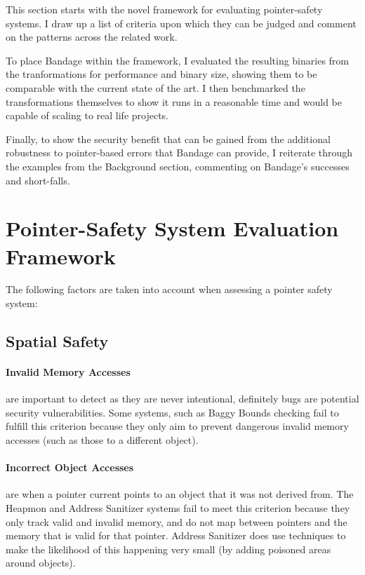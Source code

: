 \newcommand*\rot{\rotatebox{90}}
\newcommand{\xmark}{\ding{55}}

This section starts with the novel framework for evaluating pointer-safety systems.
I draw up a list of criteria upon which they can be judged and comment on the patterns across the related work.

To place Bandage within the framework, I evaluated the resulting binaries from the tranformations for performance and binary size, showing them to be comparable with the current state of the art.
I then benchmarked the transformations themselves to show it runs in a reasonable time and would be capable of scaling to real life projects.

Finally, to show the security benefit that can be gained from the additional robustness to pointer-based errors that Bandage can provide, I reiterate through the examples from the Background section, commenting on Bandage's successes and short-falls.

\section{Pointer-Safety System Evaluation Framework}

The following factors are taken into account when assessing a pointer safety system:

\subsection{Spatial Safety}

\paragraph{Invalid Memory Accesses} are important to detect as they are never intentional, definitely bugs are potential security vulnerabilities.
Some systems, such as Baggy Bounds checking fail to fulfill this criterion because they only aim to prevent dangerous invalid memory accesses (such as those to a different object).

\paragraph{Incorrect Object Accesses} are when a pointer current points to an object that it was not derived from.
The Heapmon and Address Sanitizer systems fail to meet this criterion because they only track valid and invalid memory, and do not map between pointers and the memory that is valid for that pointer.
Address Sanitizer does use techniques to make the likelihood of this happening very small (by adding poisoned areas around objects).


